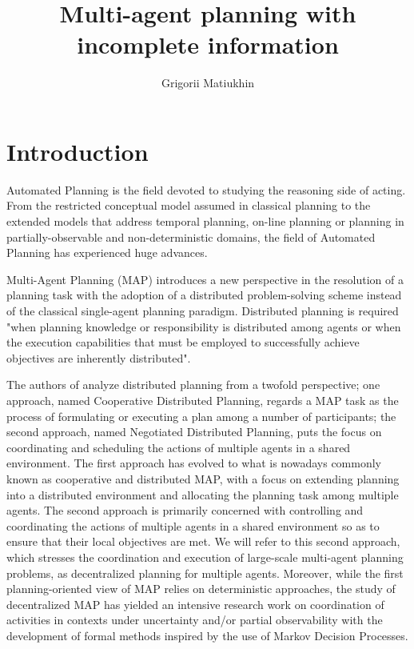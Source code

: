 \documentclass[12pt]{article}
\author{Grigorii Matiukhin}
\date{\DTMDisplaydate{2024}{3}{17}{-1}}
\title{Multi-agent planning with incomplete information}
\begin{document}
\maketitle
\thispagestyle{empty}

\newpage

\tableofcontents

\newpage
\section{Introduction}

Automated Planning is the field devoted to studying the reasoning side of acting. From the restricted conceptual model assumed in classical planning to the extended models that address temporal planning, on-line planning or planning in partially-observable and non-deterministic domains, the field of Automated Planning has experienced huge advances\cite{ghallab2004automated}.

Multi-Agent Planning (MAP) introduces a new perspective in the resolution of a planning task with the adoption of a distributed problem-solving scheme instead of the classical single-agent planning paradigm. Distributed planning is required "when planning knowledge or responsibility is distributed among agents or when the execution capabilities that must be employed to successfully achieve objectives are inherently distributed"\cite{desJardins1999ASO}.

The authors of \cite{desJardins1999ASO} analyze distributed planning from a twofold perspective; one approach, named Cooperative Distributed Planning, regards a MAP task as the process of formulating or executing a plan among a number of participants; the second approach, named Negotiated Distributed Planning, puts the focus on coordinating and scheduling the actions of multiple agents in a shared environment. The first approach has evolved to what is nowadays commonly known as cooperative and distributed MAP, with a focus on extending planning into a distributed environment and allocating the planning task among multiple agents. The second approach is primarily concerned with controlling and coordinating the actions of multiple agents in a shared environment so as to ensure that their local objectives are met. We will refer to this second approach, which stresses the coordination and execution of large-scale multi-agent planning problems, as decentralized planning for multiple agents. Moreover, while the first planning-oriented view of MAP relies on deterministic approaches, the study of decentralized MAP has yielded an intensive research work on coordination of activities in contexts under uncertainty and/or partial observability with the development of formal methods inspired by the use of Markov Decision Processes\cite{Seuken2008}.
\end{document}
